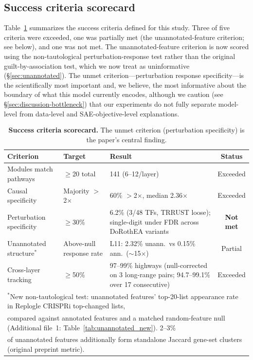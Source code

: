 \documentclass[onecolumn]{article}
\begin{document}
\subsection{Success criteria scorecard}
\label{sec:scorecard}

Table~\ref{tab:scorecard} summarizes the success criteria defined for this study. Three of five criteria were exceeded, one was partially met (the unannotated-feature criterion; see below), and one was not met. The unannotated-feature criterion is now scored using the non-tautological perturbation-response test rather than the original guilt-by-association test, which we now treat as uninformative (\S\ref{sec:unannotated}). The unmet criterion---perturbation response specificity---is the scientifically most important and, we believe, the most informative about the boundary of what this model currently encodes, although we caution (see \S\ref{sec:discussion-bottleneck}) that our experiments do not fully separate model-level from data-level and SAE-objective-level explanations.

\begin{table}[t]
\centering
\caption{\textbf{Success criteria scorecard.} The unmet criterion (perturbation specificity) is the paper's central finding.}
\label{tab:scorecard}
\smallskip
\begin{tabular}{p{3.5cm}p{2.5cm}p{4cm}c}
\toprule
Criterion & Target & Result & Status \\
\midrule
Modules match pathways & $\geq$20 total & 141 (6--12/layer) & Exceeded \\
Causal specificity & Majority $>$2$\times$ & 60\% $>$2$\times$, median 2.36$\times$ & Exceeded \\
Perturbation specificity & $\geq$30\% & 6.2\% (3/48 TFs, TRRUST loose); single-digit under FDR across DoRothEA variants & \textbf{Not met} \\
Unannotated structure$^*$ & Above-null response rate & L11: 2.32\% unann.\ vs 0.15\% ann.\ ($\sim$15$\times$) & Partial \\
Cross-layer tracking & $\geq$50\% & 97--99\% highways (null-corrected on 3 long-range pairs; 94.7--99.1\% over 17 consecutive) & Exceeded \\
\bottomrule
\multicolumn{4}{l}{\small $^*$New non-tautological test: unannotated features' top-20-list appearance rate in Replogle CRISPRi top-changed lists,} \\
\multicolumn{4}{l}{\small compared against annotated features and a matched random-feature null (Additional file~1: Table~\ref{tab:unannotated_new}). 2--3\%}\\
\multicolumn{4}{l}{\small of unannotated features additionally form standalone Jaccard gene-set clusters (original preprint metric).}
\end{tabular}
\end{table}
\end{document}
